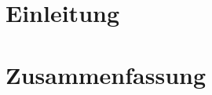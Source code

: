 %
%
%
%
\chapter{Einleitung}\label{sec:einleitung}





\chapter{Zusammenfassung}\label{sec:zusammenfassung}